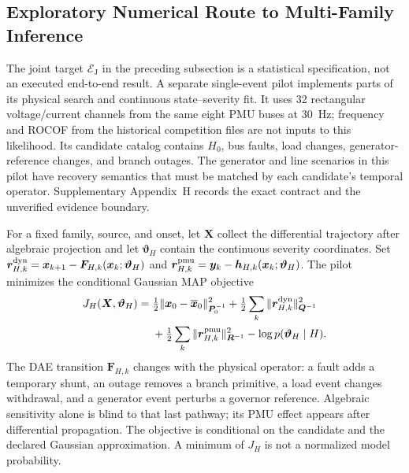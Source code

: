 \subsection{Exploratory Numerical Route to Multi-Family Inference}
\label{sec:single-event-route}

The joint target $\mathcal E_{\mathrm J}$ in the preceding subsection is a statistical specification, not an executed end-to-end result. A separate single-event pilot implements parts of its physical search and continuous state--severity fit. It uses 32 rectangular voltage/current channels from the same eight PMU buses at 30~Hz; frequency and ROCOF from the historical competition files are not inputs to this likelihood. Its candidate catalog contains $H_0$, bus faults, load changes, generator-reference changes, and branch outages. The generator and line scenarios in this pilot have recovery semantics that must be matched by each candidate's temporal operator. Supplementary Appendix~H records the exact contract and the unverified evidence boundary.

For a fixed family, source, and onset, let $\bm X$ collect the differential trajectory after algebraic projection and let $\bm\vartheta_H$ contain the continuous severity coordinates. Set $\bm r^{\rm dyn}_{H,k}=\bm x_{k+1}-\bm F_{H,k}(\bm x_k;\bm\vartheta_H)$ and $\bm r^{\rm pmu}_{H,k}=\bm y_k-\bm h_{H,k}(\bm x_k;\bm\vartheta_H)$. The pilot minimizes the conditional Gaussian MAP objective
\begin{equation}
\begin{aligned}
J_H(\bm X,\bm\vartheta_H)={}&
\tfrac12\|\bm x_0-\overline{\bm x}_0\|_{\bm P_0^{-1}}^2
+\tfrac12\sum_k\|\bm r^{\rm dyn}_{H,k}\|_{\bm Q^{-1}}^2\\
&+\tfrac12\sum_k\|\bm r^{\rm pmu}_{H,k}\|_{\bm R^{-1}}^2
-\log p(\bm\vartheta_H\mid H).
\end{aligned}
\label{eq:pilot-map}
\end{equation}
The DAE transition $\bm F_{H,k}$ changes with the physical operator: a fault adds a temporary shunt, an outage removes a branch primitive, a load event changes withdrawal, and a generator event perturbs a governor reference. Algebraic sensitivity alone is blind to that last pathway; its PMU effect appears after differential propagation. The objective is conditional on the candidate and the declared Gaussian approximation. A minimum of $J_H$ is not a normalized model probability.

